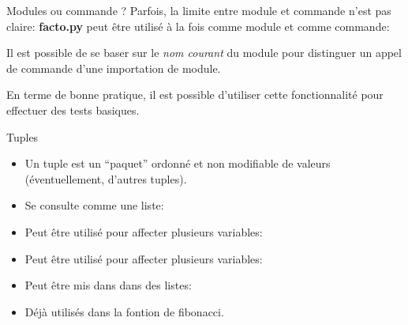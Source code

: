 \documentclass{beamer}
\begin{document}
\begin{frame}[fragile]{Modules ou commande ?}
  Parfois, la limite entre module et commande n'est pas claire: {\bf facto.py} peut être utilisé à la fois comme module et comme commande:

  Il est possible de se baser sur le {\em nom courant} du module pour distinguer un appel de commande d'une importation de module.

  \fbox{}

  En terme de bonne pratique, il est possible d'utiliser cette fonctionnalité pour effectuer des tests basiques.
  
\end{frame}

\begin{frame}{Tuples}
  \begin{itemize}
  \item Un tuple est un ``paquet'' ordonné et non modifiable de valeurs (éventuellement, d'autres tuples).
    \newline{}
  \item Se consulte comme une liste:
    \newline{}
  \item  Peut être utilisé pour affecter plusieurs variables:
    \newline{}
  \item Peut être utilisé pour affecter plusieurs variables:
    \newline{}
  \item Peut être mis dans dans des listes:
    \newline{}
  \item Déjà utilisés dans la fontion de fibonacci.
  \end{itemize}
\end{frame}
\end{document}
